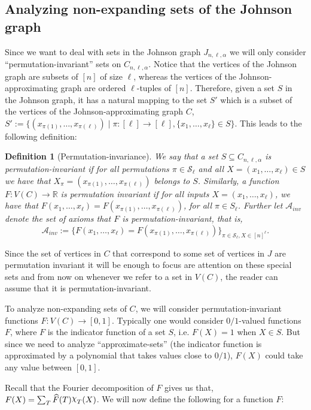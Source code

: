 \documentclass[11pt]{article}
\def \R {\mathbb{R}}
\def \A {\mathcal{A}}
\def \Chi {\raisebox{2pt}{$\chi$}}
\renewcommand{\hat}[1]{\widehat{#1}}
\newtheorem{definition}[theorem]{Definition}
\theoremstyle{definition}
\begin{document}
\subsection{Analyzing non-expanding sets of the Johnson graph}
Since we want to deal with sets in the Johnson graph $J_{n,\ell,\alpha}$ we will only consider ``permutation-invariant'' sets on $C_{n,\ell,
\alpha}$. Notice that the vertices of the Johnson graph are subsets of $[n]$ of size $\ell$, whereas the vertices of the Johnson-approximating graph are ordered $\ell$-tuples of $[n]$. Therefore, given a set $S$ in the Johnson graph, it has a natural mapping to the set $S'$ which is a subset of the vertices of the Johnson-approximating graph $C$, 
$S' := \{(x_{\pi(1)},\ldots,x_{\pi(\ell)}) \mid \pi: [\ell] \rightarrow [\ell], \{x_1,\ldots,x_{\ell}\} \in S\}$. This leads to the following definition:

\begin{definition}[Permutation-invariance]\label{def:perm-inv}
We say that a set $S \subseteq C_{n,\ell,\alpha}$ is permutation-invariant if for all permutations $\pi \in \mathcal{S}_\ell$ and all $X = (x_1,\ldots,x_\ell) \in S$ we have that $X_{\pi} = (x_{\pi(1)},\ldots,x_{\pi(\ell)})$ belongs to $S$. Similarly, a function $F: V(C) \rightarrow \R$ is permutation invariant if for all inputs $X = (x_1,\ldots,x_{\ell})$, we have that $F(x_1,\ldots,x_\ell) = F(x_{\pi(1)},\ldots,x_{\pi(\ell)})$, for all $\pi\in S_{\ell}$. Further let $\A_{inv}$ denote the set of axioms that $F$ is permutation-invariant, that is, 
\[\A_{inv} := \{F(x_1,\ldots,x_\ell) = F(x_{\pi(1)},\ldots,x_{\pi(\ell)})\}_{\pi \in \mathcal{S}_\ell, X \in [n]^\ell}.\]
\end{definition}

Since the set of vertices in $C$ that correspond to some set of vertices in $J$ are permutation invariant it will be enough to focus are attention on these special sets and from now on whenever we refer to a set in $V(C)$, the reader can assume that it is permutation-invariant.

To analyze non-expanding sets of $C$, we will consider permutation-invariant functions $F: V(C) \rightarrow [0,1]$. Typically one would consider $0/1$-valued functions $F$, where $F$ is the indicator function of a set $S$, i.e. $F(X) = 1$ when $X \in S$. But since we need to analyze ``approximate-sets'' (the indicator function is approximated by a polynomial that takes values close to $0/1$), $F(X)$ could take any value between $[0,1]$.

Recall that the Fourier decomposition of $F$ gives us that, $F(X) = \sum_T \hat{F}(T)\Chi_T(X)$. We will now define the following for a function $F$:
\end{document}
